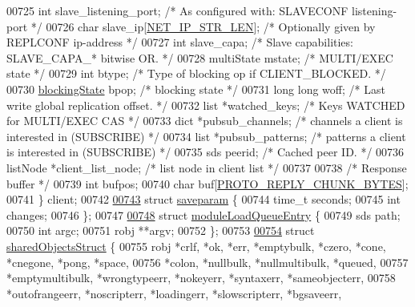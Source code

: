 \begin{DoxyCode}
{{{{{{00725     \textcolor{keywordtype}{int} slave\_listening\_port; \textcolor{comment}{/* As configured with: SLAVECONF listening-port */}
00726     \textcolor{keywordtype}{char} slave\_ip[\hyperlink{server_8h_ad97c5405ed22a94e9fcc10fba577d6c0}{NET\_IP\_STR\_LEN}]; \textcolor{comment}{/* Optionally given by REPLCONF ip-address */}
00727     \textcolor{keywordtype}{int} slave\_capa;         \textcolor{comment}{/* Slave capabilities: SLAVE\_CAPA\_* bitwise OR. */}
00728     multiState mstate;      \textcolor{comment}{/* MULTI/EXEC state */}
00729     \textcolor{keywordtype}{int} btype;              \textcolor{comment}{/* Type of blocking op if CLIENT\_BLOCKED. */}
00730     \hyperlink{structblockingState}{blockingState} bpop;     \textcolor{comment}{/* blocking state */}
00731     \textcolor{keywordtype}{long} \textcolor{keywordtype}{long} woff;         \textcolor{comment}{/* Last write global replication offset. */}
00732     list *watched\_keys;     \textcolor{comment}{/* Keys WATCHED for MULTI/EXEC CAS */}
00733     dict *pubsub\_channels;  \textcolor{comment}{/* channels a client is interested in (SUBSCRIBE) */}
00734     list *pubsub\_patterns;  \textcolor{comment}{/* patterns a client is interested in (SUBSCRIBE) */}
00735     sds peerid;             \textcolor{comment}{/* Cached peer ID. */}
00736     listNode *client\_list\_node; \textcolor{comment}{/* list node in client list */}
00737 
00738     \textcolor{comment}{/* Response buffer */}
00739     \textcolor{keywordtype}{int} bufpos;
00740     \textcolor{keywordtype}{char} buf[\hyperlink{server_8h_ab467e0a40be9097e85445616d9bb32e3}{PROTO\_REPLY\_CHUNK\_BYTES}];
00741 \} client;
00742 
\hyperlink{structsaveparam}{00743} \textcolor{keyword}{struct} \hyperlink{structsaveparam}{saveparam} \{
00744     time\_t seconds;
00745     \textcolor{keywordtype}{int} changes;
00746 \};
00747 
\hyperlink{structmoduleLoadQueueEntry}{00748} \textcolor{keyword}{struct} \hyperlink{structmoduleLoadQueueEntry}{moduleLoadQueueEntry} \{
00749     sds path;
00750     \textcolor{keywordtype}{int} argc;
00751     robj **argv;
00752 \};
00753 
\hyperlink{structsharedObjectsStruct}{00754} \textcolor{keyword}{struct} \hyperlink{structsharedObjectsStruct}{sharedObjectsStruct} \{
00755     robj *crlf, *ok, *err, *emptybulk, *czero, *cone, *cnegone, *pong, *space,
00756     *colon, *nullbulk, *nullmultibulk, *queued,
00757     *emptymultibulk, *wrongtypeerr, *nokeyerr, *syntaxerr, *sameobjecterr,
00758     *outofrangeerr, *noscripterr, *loadingerr, *slowscripterr, *bgsaveerr,
}}}}}}
\end{DoxyCode}
